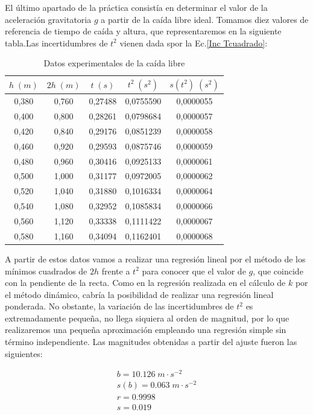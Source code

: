 \documentclass[a4paper,12pt,titlepage]{article}
\begin{document}
El último apartado de la práctica consistía en determinar el valor de la aceleración gravitatoria $g$ a partir de la caída libre ideal. Tomamos diez valores de referencia de tiempo de caída y altura, que representaremos en la siguiente tabla.Las incertidumbres de $t^2$ vienen dada spor la Ec.\ref{Inc Tcuadrado}:

\begin{table}[h!]
    \centering
    \begin{tabular}{|c|c|c|c|c|}
    \hline
    $h \; (m)$ & $2h \; (m)$ & $t \; (s)$ & $t^2 \; (s^2)$ & $s(t^2) \; (s^2)$ \\ \hline
    0,380 & 0,760 & 0,27488 & 0,0755590 & 0,0000055 \\ \hline
    0,400  & 0,800  & 0,28261 & 0,0798684 & 0,0000057 \\ \hline
    0,420 & 0,840 & 0,29176 & 0,0851239 & 0,0000058 \\ \hline
    0,460 & 0,920 & 0,29593 & 0,0875746 & 0,0000059 \\ \hline
    0,480 & 0,960 & 0,30416 & 0,0925133 & 0,0000061 \\ \hline
    0,500  & 1,000    & 0,31177 & 0,0972005 & 0,0000062 \\ \hline
    0,520 & 1,040 & 0,31880  & 0,1016334  & 0,0000064 \\ \hline
    0,540 & 1,080 & 0,32952 & 0,1085834  & 0,0000066 \\ \hline
    0,560 & 1,120 & 0,33338 & 0,1111422 & 0,0000067 \\ \hline
    0,580 & 1,160 & 0,34094 & 0,1162401 & 0,0000068 \\ \hline
    \end{tabular}
    \caption{Datos experimentales de la caída libre}
    \label{Datos gravedad}
\end{table}

A partir de estos datos vamos a realizar una regresión lineal por el método de los mínimos cuadrados de $2h$ frente a $t^2$ para conocer que el valor de $g$, que coincide con la pendiente de la recta. Como en la regresión realizada en el cálculo de $k$ por el método dinámico, cabría la posibilidad de realizar una regresión lineal ponderada. No obstante, la variación de las incertidumbres de $t^2$ es extremadamente pequeña, no llega siquiera al orden de magnitud, por lo que realizaremos una pequeña aproximación empleando una regresión simple sin término independiente. Las magnitudes obtenidas a partir del ajuste fueron las siguientes:

\begin{equation}
    \begin{gathered}
        b =  10.126 \; m \cdot s^{-2} \\
        s(b) = 0.063 \; m \cdot s^{-2} \\
        r =  0.9998 \\
        s =  0.019
    \end{gathered}
\end{equation}
\end{document}
